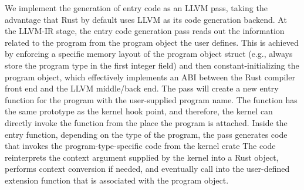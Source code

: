 We implement the generation of entry code as an LLVM pass, taking the advantage
    that Rust by default uses LLVM as its code generation backend.
At the LLVM-IR stage, the entry code generation pass reads out the information
    related to the program from the program object the user defines.
This is achieved by enforcing a specific memory layout of the program object
    struct (e.g., always store the program type in the first integer field) and
    then constant-initializing the program object, which effectively implements
    an ABI between the Rust compiler front end and the LLVM middle/back end.
The pass will create a new entry function for the program with the
    user-supplied program name.
The function has the same prototype as the kernel hook point, and therefore,
    the kernel can directly invoke the function from the place the program is
    attached.
Inside the entry function, depending on the type of the program, the pass
    generates code that invokes the program-type-specific code from the
    \projname{} kernel crate
The code reinterprets the context argument supplied by the kernel into a Rust
    object, performs context conversion if needed, and eventually call into the
    user-defined extension function that is associated with the \projname{}
    program object.


